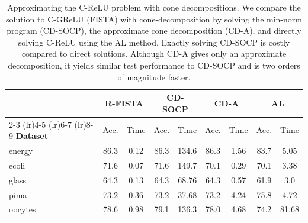 
\setlength{\tabcolsep}{3pt} %
\begin{table}[t]
	\centering
	\caption{Approximating the C-ReLU problem with cone decompositions.
		We compare the solution to C-GReLU (FISTA) with cone-decomposition by solving the min-norm program (CD-SOCP),
		the approximate cone decomposition (CD-A), and directly solving C-ReLU using the AL method.
		Exactly solving CD-SOCP is costly compared to direct solutions.
		Although CD-A gives only an approximate decomposition, it yields similar
		test performance to CD-SOCP and is two orders of magnitude faster.
	}%
	\label{table:cone-decomp}
	\vspace{0.1in}
	\begin{small}
		\begin{tabular}{lcccccccc}
			                 & \multicolumn{2}{c}{\textbf{R-FISTA}} & \multicolumn{2}{c}{\textbf{CD-SOCP}} & \multicolumn{2}{c}{\textbf{CD-A}} & \multicolumn{2}{c}{\textbf{AL}}                              \\ \cmidrule(lr){2-3}  \cmidrule(lr){4-5}  \cmidrule(lr){6-7} \cmidrule(lr){8-9}
			\textbf{Dataset} & Acc.                                 & Time                                 & Acc.                              & Time                            & Acc. & Time & Acc. & Time  \\ \midrule
			energy           & 86.3                                 & 0.12                                 & 86.3                              & 134.6                           & 86.3 & 1.56 & 83.7 & 5.05  \\
			ecoli            & 71.6                                 & 0.07                                 & 71.6                              & 149.7                           & 70.1 & 0.29 & 70.1 & 3.38  \\
			glass            & 64.3                                 & 0.13                                 & 64.3                              & 68.76                           & 64.3 & 0.57 & 61.9 & 3.0   \\
			pima             & 73.2                                 & 0.36                                 & 73.2                              & 37.68                           & 73.2 & 4.24 & 75.8 & 4.72  \\
			oocytes          & 78.6                                 & 0.98                                 & 79.1                              & 136.3                           & 78.0 & 4.68 & 74.2 & 81.68 \\ \bottomrule
		\end{tabular}
	\end{small}
\end{table}
\setlength{\tabcolsep}{6pt}






